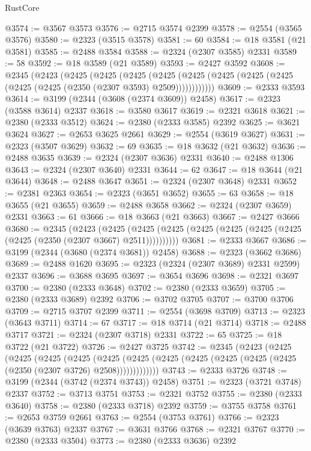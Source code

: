 \begin{lexlean}{RustCore}
\begin{coremodule}
@3574 := @3567 @3573
@3576 := @2715 @3574 @2399
@3578 := @2554 (@3565 @3576)
@3580 := @2323 (@3515 @3578)
@3581 := 60
@3584 := @18 @3581 (@21 @3581)
@3585 := @2488 @3584
@3588 := @2324 (@2307 @3585) @2331
@3589 := 58
@3592 := @18 @3589 (@21 @3589)
@3593 := @2427 @3592
@3608 := @2345
    (@2423
      (@2425
        (@2425
          (@2425
            (@2425 (@2425 (@2425 (@2425 (@2425 (@2425 (@2425 (@2350 (@2307 @3593) @2509))))))))))))
@3609 := @2333 @3593
@3614 := @3199 (@2344 (@3608 (@2374 @3609)) @2458)
@3617 := @2323 (@3588 @3614) @2337
@3618 := @3580 @3617
@3619 := @2321 @3618
@3621 := @2380 (@2333 @3512)
@3624 := @2380 (@2333 @3585) @2392
@3625 := @3621 @3624
@3627 := @2653 @3625 @2661
@3629 := @2554 (@3619 @3627)
@3631 := @2323 (@3507 @3629)
@3632 := 69
@3635 := @18 @3632 (@21 @3632)
@3636 := @2488 @3635
@3639 := @2324 (@2307 @3636) @2331
@3640 := @2488 @1306
@3643 := @2324 (@2307 @3640) @2331
@3644 := 62
@3647 := @18 @3644 (@21 @3644)
@3648 := @2488 @3647
@3651 := @2324 (@2307 @3648) @2331
@3652 := @2381 @2363
@3654 := @2323 (@3651 @3652)
@3655 := 63
@3658 := @18 @3655 (@21 @3655)
@3659 := @2488 @3658
@3662 := @2324 (@2307 @3659) @2331
@3663 := 61
@3666 := @18 @3663 (@21 @3663)
@3667 := @2427 @3666
@3680 := @2345
    (@2423
      (@2425 (@2425 (@2425 (@2425 (@2425 (@2425 (@2425 (@2425 (@2350 (@2307 @3667) @2511))))))))))
@3681 := @2333 @3667
@3686 := @3199 (@2344 (@3680 (@2374 @3681)) @2458)
@3688 := @2323 (@3662 @3686)
@3689 := @2488 @1620
@3695 := @2323 (@2324 (@2307 @3689) @2331 @2599) @2337
@3696 := @3688 @3695
@3697 := @3654 @3696
@3698 := @2321 @3697
@3700 := @2380 (@2333 @3648)
@3702 := @2380 (@2333 @3659)
@3705 := @2380 (@2333 @3689) @2392
@3706 := @3702 @3705
@3707 := @3700 @3706
@3709 := @2715 @3707 @2399
@3711 := @2554 (@3698 @3709)
@3713 := @2323 (@3643 @3711)
@3714 := 67
@3717 := @18 @3714 (@21 @3714)
@3718 := @2488 @3717
@3721 := @2324 (@2307 @3718) @2331
@3722 := 65
@3725 := @18 @3722 (@21 @3722)
@3726 := @2427 @3725
@3742 := @2345
    (@2423
      (@2425
        (@2425
          (@2425
            (@2425
              (@2425
                (@2425 (@2425 (@2425 (@2425 (@2425 (@2425 (@2350 (@2307 @3726) @2508)))))))))))))
@3743 := @2333 @3726
@3748 := @3199 (@2344 (@3742 (@2374 @3743)) @2458)
@3751 := @2323 (@3721 @3748) @2337
@3752 := @3713 @3751
@3753 := @2321 @3752
@3755 := @2380 (@2333 @3640)
@3758 := @2380 (@2333 @3718) @2392
@3759 := @3755 @3758
@3761 := @2653 @3759 @2661
@3763 := @2554 (@3753 @3761)
@3766 := @2323 (@3639 @3763) @2337
@3767 := @3631 @3766
@3768 := @2321 @3767
@3770 := @2380 (@2333 @3504)
@3773 := @2380 (@2333 @3636) @2392

\end{coremodule}
\end{lexlean}
